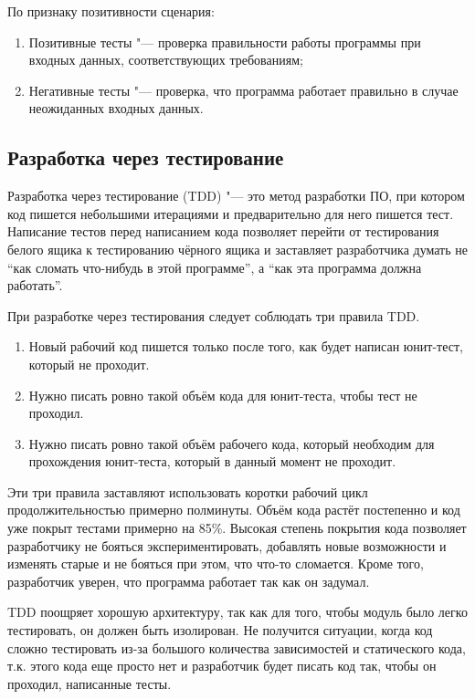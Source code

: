 По признаку позитивности сценария:
\begin{enumerate}
  \item Позитивные тесты "--- проверка правильности работы программы при входных данных, соответствующих требованиям;
  \item Негативные тесты "--- проверка, что программа работает правильно в случае неожиданных входных данных.
\end{enumerate}

\subsection{Разработка через тестирование}
\label{subsec:testing:tdd}

Разработка через тестирование (TDD) "--- это метод разработки ПО, при котором код пишется небольшими итерациями и предварительно для него пишется тест.
Написание тестов перед написанием кода позволяет перейти от тестирования белого ящика к тестированию чёрного ящика и заставляет разработчика думать не ``как сломать что-нибудь в этой программе'', а ``как эта программа должна работать''.

При разработке через тестирования следует соблюдать три правила TDD\@.
\begin{enumerate}
  \item Новый рабочий код пишется только после того, как будет написан юнит-тест, который не проходит.
  \item Нужно писать ровно такой объём кода для юнит-теста, чтобы тест не проходил.
  \item Нужно писать ровно такой объём рабочего кода, который необходим для прохождения юнит-теста, который в данный момент не проходит.
\end{enumerate}

Эти три правила заставляют использовать коротки рабочий цикл продолжительностью примерно полминуты.
Объём кода растёт постепенно и код уже покрыт тестами примерно на 85\%.
Высокая степень покрытия кода позволяет разработчику не бояться экспериментировать, добавлять новые возможности и изменять старые и не бояться при этом, что что-то сломается.
Кроме того, разработчик уверен, что программа работает так как он задумал.

TDD поощряет хорошую архитектуру, так как для того, чтобы модуль было легко тестировать, он должен быть изолирован.
Не получится ситуации, когда код сложно тестировать из-за большого количества зависимостей и статического кода, т.к. этого кода еще просто нет и разработчик будет писать код так, чтобы он проходил, написанные тесты.

